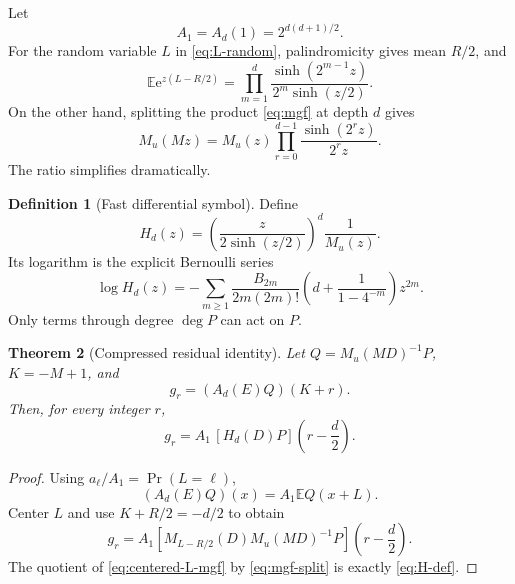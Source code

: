 \documentclass[11pt,oneside]{article}
\newtheorem{theorem}{Theorem}[section]
\theoremstyle{definition}
\newtheorem{definition}[theorem]{Definition}
\theoremstyle{remark}
\newcommand{\e}{\mathrm e}
\newcommand{\E}{\mathbb E}
\begin{document}
Let
\begin{equation}
 A_1=A_d(1)=2^{d(d+1)/2}.                                 \label{eq:A1}
\end{equation}
For the random variable $L$ in \eqref{eq:L-random}, palindromicity gives mean $R/2$, and
\begin{equation}
 \E\e^{z(L-R/2)}
 =\prod_{m=1}^{d}
 \frac{\sinh(2^{m-1}z)}{2^m\sinh(z/2)}.                  \label{eq:centered-L-mgf}
\end{equation}
On the other hand, splitting the product \eqref{eq:mgf} at depth $d$ gives
\begin{equation}
 M_u(Mz)=M_u(z)\prod_{r=0}^{d-1}
 \frac{\sinh(2^rz)}{2^rz}.                               \label{eq:mgf-split}
\end{equation}
The ratio simplifies dramatically.

\begin{definition}[Fast differential symbol]
\label{def:H}
Define
\begin{equation}
 H_d(z)=\left(\frac{z}{2\sinh(z/2)}\right)^d\frac1{M_u(z)}. \label{eq:H-def}
\end{equation}
Its logarithm is the explicit Bernoulli series
\begin{equation}
 \boxed{
 \log H_d(z)=
 -\sum_{m\ge1}
 \frac{B_{2m}}{2m(2m)!}
 \left(d+\frac1{1-4^{-m}}\right)z^{2m}.}                 \label{eq:H-log}
\end{equation}
Only terms through degree $\deg P$ can act on $P$.
\end{definition}

\begin{theorem}[Compressed residual identity]
\label{thm:g-identity}
Let $Q=M_u(MD)^{-1}P$, $K=-M+1$, and
\begin{equation}
 g_r=(A_d(E)Q)(K+r).                                      \label{eq:g-def}
\end{equation}
Then, for every integer $r$,
\begin{equation}
 \boxed{
 g_r=A_1\,[H_d(D)P]\!\left(r-\frac d2\right).}          \label{eq:g-fast}
\end{equation}
\end{theorem}

\begin{proof}
Using $a_\ell/A_1=\Pr(L=\ell)$,
\[
 (A_d(E)Q)(x)=A_1\E Q(x+L).
\]
Center $L$ and use $K+R/2=-d/2$ to obtain
\[
 g_r=A_1\left[
 M_{L-R/2}(D)M_u(MD)^{-1}P
 \right]\!\left(r-\frac d2\right).
\]
The quotient of \eqref{eq:centered-L-mgf} by \eqref{eq:mgf-split} is exactly \eqref{eq:H-def}.
\end{proof}
\end{document}
